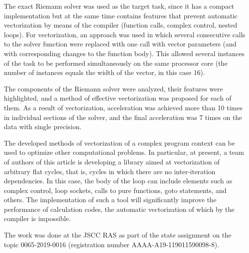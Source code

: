 \documentclass[utf8,english]{psta}%
\begin{document}
The exact Riemann solver was used as the target task, since it has a compact implementation but at the same time contains features that prevent automatic vectorization by means of the compiler (function calls, complex control, nested loops).
For vectorization, an approach was used in which several consecutive calls to the solver function were replaced with one call with vector parameters (and with corresponding changes to the function body).
This allowed several instances of the task to be performed simultaneously on the same processor core (the number of instances equals the width of the vector, in this case 16).

The components of the Riemann solver were analyzed, their features were highlighted, and a method of effective vectorization was proposed for each of them.
As a result of vectorization, acceleration was achieved more than 10 times in individual sections of the solver, and the final acceleration was 7 times on the data with single precision.

The developed methods of vectorization of a complex program context can be used to optimize other computational problems.
In particular, at present, a team of authors of this article is developing a library aimed at vectorization of arbitrary flat cycles, that is, cycles in which there are no inter-iteration dependencies.
In this case, the body of the loop can include elements such as complex control, loop sockets, calls to pure functions, goto statements, and others.
The implementation of such a tool will significantly improve the performance of calculation codes, the automatic vectorization of which by the compiler is impossible.

The work was done at the JSCC RAS as part of the state assignment on the topic 0065-2019-0016 (registration number AAAA-A19-119011590098-8). 
\end{document}
